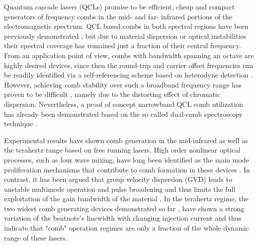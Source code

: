\documentclass[twocolumn,secnumarabic,amssymb, nobibnotes, aps, prd]{revtex4-1}
\begin{document}
Quantum cascade lasers (QCLs)  promise to be efficient, cheap and compact generators of frequency combs in the mid- and far- infrared portions of the electromagnetic spectrum. QCL based combs in both spectral regions have been previously demonstrated \cite{wienold2014evidence,burghoff2014terahertz,hugi2012mid}, but due to material dispersion or optical instabilities their spectral coverage has remained just a fraction of their central frequency. From an application point of view, combs with bandwidth spanning an octave are highly desired devices, since then the round-trip and carrier offset frequencies can be readily identified via a self-referencing scheme based on heterodyne detection \cite{ye2005femtosecond}. However, achieving comb stability over such a broadband frequency range has proven to be difficult \cite{rosch2015octave}, namely due to the distorting effect of chromatic dispersion. Nevertheless, a proof of concept narrowband QCL comb utilization has already been demonstrated based on the so called dual-comb spectroscopy technique \cite{villares2014dual}.

Experimental results have shown comb generation in the mid-infrared \cite{hugi2012mid} as well as the terahertz \cite{wienold2014evidence,burghoff2014terahertz,rosch2015octave} range based on free running lasers. High order nonlinear optical processes, such as four wave mixing, have long been identified as the main mode proliferation mechanisms that contribute to comb formation in these devices \cite{friedli2013four,khurgin2014coherent}. In contrast, it has been argued that group velocity dispersion (GVD) leads to unstable multimode operation and pulse broadening and thus limits the full exploitation of the gain bandwidth of the material \cite{villares2015quantum}. In the terahertz regime, the two widest comb generating devices demonstrated so far \cite{burghoff2014terahertz,rosch2015octave}, have shown a strong variation of the beatnote's linewidth with changing injection current and thus indicate that "comb"  operation regimes are only a fraction of the whole dynamic range of these lasers. 
\end{document}
